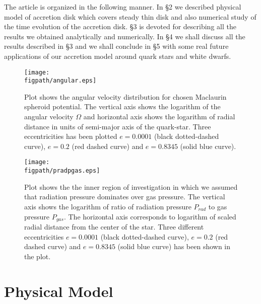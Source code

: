 \documentclass[useAMS,usenatbib]{mn2e}
\newcommand{\figpath}{./Figs/}
\begin{document}
The article is organized in the following manner. In \S 2 we described physical model of accretion disk which covers steady thin disk and also numerical study of the time evolution of the accretion disk. \S3 is devoted for describing all the results we obtained analytically and numerically. In \S4 we shall discuss all the results described in \S3 and we shall conclude in \S5 with some real future applications of our accretion model around quark stars and white dwarfs.  
\begin{figure}
\centering
\texttt{[image: \\figpath/angular.eps]}
\caption{\small{Plot shows the angular velocity distribution for chosen Maclaurin spheroid potential. The vertical axis shows the logarithm of the angular velocity $\Omega$ and horizontal axis shows the logarithm of radial distance in units of semi-major axis of the quark-star. Three eccentricities has been plotted $e = 0.0001$ (black dotted-dashed curve), $e = 0.2$ (red dashed curve) and $e = 0.8345$ (solid blue curve)}.}
\label{angular}
\end{figure}
\begin{figure}
\centering
\texttt{[image: \\figpath/pradpgas.eps]}
\caption{\small{Plot shows the the inner region of investigation in which we assumed that radiation pressure dominates over gas pressure. The vertical axis shows the logarithm of ratio of radiation pressure $P_{rad}$ to gas pressure $P_{gas}$. The horizontal axis corresponds to logarithm of scaled radial distance from the center of the star. Three different eccentricities $e = 0.0001$ (black dotted-dashed curve), $e = 0.2$ (red dashed curve) and $e = 0.8345$ (solid blue curve) has been shown in the plot.}}
\label{prpg}
\end{figure} 
\section{Physical Model}
\end{document}
